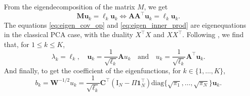 From the eigendecomposition of the matrix $M$, we get
\begin{equation}\label{eq:eigen_inner_prod}
    \mathbf{M}\boldsymbol{u}_k = \ell_k \boldsymbol{u}_k \Longleftrightarrow \mathbf{A}\mathbf{A}^\top \boldsymbol{u}_k = \ell_k \boldsymbol{u}_k.
\end{equation}
The equations \eqref{eq:eigen_cov_op} and \eqref{eq:eigen_inner_prod} are eigenequations in the classical PCA case, with the duality $X^\top X$ and $XX^\top$. Following \cite{pagesMultipleFactorAnalysis2014,hardleAppliedMultivariateStatistical2019}, we find that, for $1 \leq k \leq K$,
\begin{equation}
    \lambda_k = \ell_k, \quad \boldsymbol{u}_k = \frac{1}{\sqrt{\ell_k}}\mathbf{A} u_k \quad\text{and}\quad u_k = \frac{1}{\sqrt{\ell_k}} \mathbf{A}^\top \boldsymbol{u}_k.
\end{equation}
And finally, to get the coefficient of the eigenfunctions, for $k \in \{1, \dots, K\}$,
\begin{equation}
    b_k = \mathbf{W}^{-1/2}u_k = \frac{1}{\sqrt{\ell_k}} \mathbf{C}^\top \left(\mathrm{I}_{\!N} - \Pi\mathbf{1}_{\!N}^\top\right) \text{diag}\{\sqrt{\pi_1}, \dots, \sqrt{\pi_N}\}\boldsymbol{u}_k.
\end{equation}


